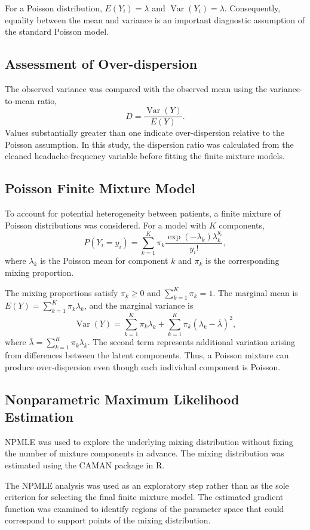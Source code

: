 For a Poisson distribution, $E(Y_i)=\lambda$ and $\operatorname{Var}(Y_i)=\lambda$. Consequently, equality between the mean and variance is an important diagnostic assumption of the standard Poisson model.

\subsection{Assessment of Over-dispersion}

The observed variance was compared with the observed mean using the variance-to-mean ratio,
\[
D=\frac{\operatorname{Var}(Y)}{E(Y)}.
\]
Values substantially greater than one indicate over-dispersion relative to the Poisson assumption. In this study, the dispersion ratio was calculated from the cleaned headache-frequency variable before fitting the finite mixture models.

\subsection{Poisson Finite Mixture Model}

To account for potential heterogeneity between patients, a finite mixture of Poisson distributions was considered. For a model with $K$ components,
\[
P(Y_i=y_i)=\sum_{k=1}^{K}\pi_k\frac{\exp(-\lambda_k)\lambda_k^{y_i}}{y_i!},
\]
where $\lambda_k$ is the Poisson mean for component $k$ and $\pi_k$ is the corresponding mixing proportion.

The mixing proportions satisfy $\pi_k\geq0$ and $\sum_{k=1}^{K}\pi_k=1$. The marginal mean is $E(Y)=\sum_{k=1}^{K}\pi_k\lambda_k$, and the marginal variance is
\[
\operatorname{Var}(Y)=\sum_{k=1}^{K}\pi_k\lambda_k+\sum_{k=1}^{K}\pi_k(\lambda_k-\bar{\lambda})^2,
\]
where $\bar{\lambda}=\sum_{k=1}^{K}\pi_k\lambda_k$. The second term represents additional variation arising from differences between the latent components. Thus, a Poisson mixture can produce over-dispersion even though each individual component is Poisson.

\subsection{Nonparametric Maximum Likelihood Estimation}

NPMLE was used to explore the underlying mixing distribution without fixing the number of mixture components in advance. The mixing distribution was estimated using the CAMAN package in R.

The NPMLE analysis was used as an exploratory step rather than as the sole criterion for selecting the final finite mixture model. The estimated gradient function was examined to identify regions of the parameter space that could correspond to support points of the mixing distribution.

